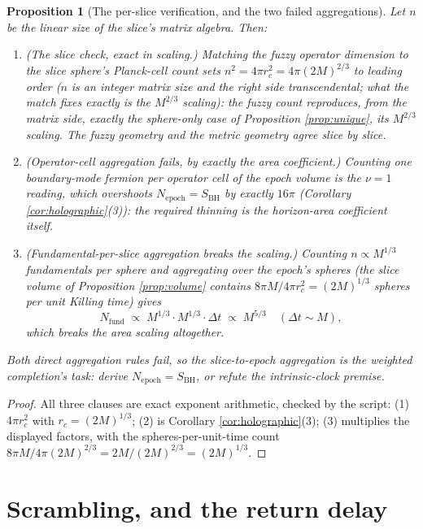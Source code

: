 \documentclass[11pt]{article}
\newtheorem{proposition}[theorem]{Proposition}
\theoremstyle{definition}
\newcommand{\SBH}{S_{\mathrm{BH}}}
\begin{document}
\begin{proposition}[The per-slice verification, and the two failed aggregations]\label{prop:n2}
Let $n$ be the linear size of the slice's matrix algebra. Then:
\begin{enumerate}
\item \emph{(The slice check, exact in scaling.)} Matching the fuzzy operator dimension to the slice sphere's Planck-cell count sets $n^2 = 4\pi r_c^2 = 4\pi(2M)^{2/3}$ to leading order ($n$ is an integer matrix size and the right side transcendental; what the match fixes exactly is the $M^{2/3}$ scaling): the fuzzy count reproduces, from the matrix side, exactly the sphere-only case of Proposition \ref{prop:unique}, its $M^{2/3}$ scaling. The fuzzy geometry and the metric geometry agree slice by slice.
\item \emph{(Operator-cell aggregation fails, by exactly the area coefficient.)} Counting one boundary-mode fermion per operator cell of the epoch volume is the $\nu = 1$ reading, which overshoots $N_{\mathrm{epoch}} = \SBH$ by exactly $16\pi$ (Corollary \ref{cor:holographic}(3)): the required thinning is the horizon-area coefficient itself.
\item \emph{(Fundamental-per-slice aggregation breaks the scaling.)} Counting $n \propto M^{1/3}$ fundamentals per sphere and aggregating over the epoch's spheres (the slice volume of Proposition \ref{prop:volume} contains $8\pi M/4\pi r_c^2 = (2M)^{1/3}$ spheres per unit Killing time) gives
\[
N_{\mathrm{fund}} \;\propto\; M^{1/3}\cdot M^{1/3}\cdot \Delta t \;\propto\; M^{5/3} \quad (\Delta t \sim M),
\]
which breaks the area scaling altogether.
\end{enumerate}
Both direct aggregation rules fail, so the slice-to-epoch aggregation is the weighted completion's task: derive $N_{\mathrm{epoch}} = \SBH$, or refute the intrinsic-clock premise.
\end{proposition}

\begin{proof}
All three clauses are exact exponent arithmetic, checked by the script: (1) $4\pi r_c^2$ with $r_c = (2M)^{1/3}$; (2) is Corollary \ref{cor:holographic}(3); (3) multiplies the displayed factors, with the spheres-per-unit-time count $8\pi M / 4\pi(2M)^{2/3} = 2M/(2M)^{2/3} = (2M)^{1/3}$.
\end{proof}

\section{Scrambling, and the return delay}\label{sec:dynamics}
\end{document}
